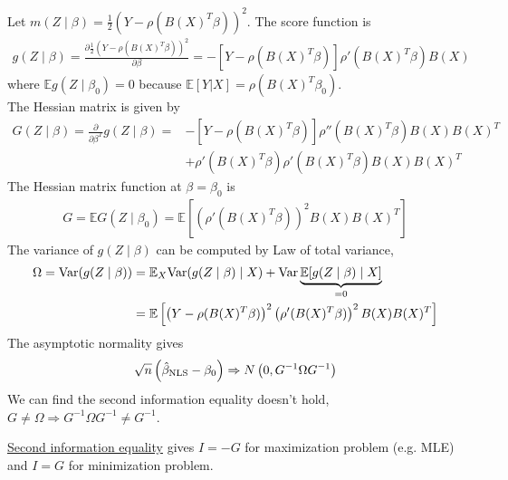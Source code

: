 \documentclass[11pt]{elegantbook}
\begin{document}
Let $m(Z\mid\beta)=\frac{1}{2}(Y-\rho(B(X)^T\beta))^2$. The score function is
\begin{equation}
    \begin{aligned}
        g(Z\mid \beta)=\frac{\partial \frac{1}{2}(Y-\rho(B(X)^T\beta))^2}{\partial \beta}=-\left[Y-\rho(B(X)^T\beta)\right]\rho'(B(X)^T\beta)B(X)
    \end{aligned}
    \nonumber
\end{equation}
where $\mathbb{E}g(Z\mid \beta_0)=0$ because $\mathbb{E}[Y|X]=\rho(B(X)^T\beta_0)$.\\
The Hessian matrix is given by
\begin{equation}
    \begin{aligned}
        G(Z\mid \beta)=\frac{\partial}{\partial \beta^T}g(Z\mid \beta)=&-\left[Y-\rho(B(X)^T\beta)\right]\rho''(B(X)^T\beta)B(X)B(X)^T\\
        &+\rho'(B(X)^T\beta)\rho'(B(X)^T\beta)B(X)B(X)^T
    \end{aligned}
    \nonumber
\end{equation}
The Hessian matrix function at $\beta=\beta_0$ is
\begin{equation}
    \begin{aligned}
        G=\mathbb{E}G(Z\mid\beta_0)=\mathbb{E}\left[(\rho'(B(X)^T\beta))^2B(X)B(X)^T\right]
    \end{aligned}
    \nonumber
\end{equation}
The variance of $g(Z\mid \beta)$ can be computed by Law of total variance,
\begin{equation}
    \begin{aligned}
        \Omega=\textnormal{Var}(g(Z\mid \beta))&=\mathbb{E}_X\textnormal{Var}(g(Z\mid \beta)\mid X)+\textnormal{Var}\underbrace{\mathbb{E}[g(Z\mid \beta)\mid X]}_{=0}\\
        &=\mathbb{E}\left[\left(Y-\rho(B(X)^T\beta)\right)^2\left(\rho'(B(X)^T\beta)\right)^2B(X)B(X)^T\right]
    \end{aligned}
    \nonumber
\end{equation}
The asymptotic normality gives
\begin{equation}
    \begin{aligned}
        \sqrt{n}\left(\hat{\beta}_\textnormal{NLS}-\beta_0\right) \Rightarrow N\left(0,G^{-1}\Omega G^{-1}\right)
    \end{aligned}
    \nonumber
\end{equation}
We can find the second information equality doesn't hold, $G\neq\Omega \Rightarrow G^{-1}\Omega G^{-1}\neq G^{-1}$.
\begin{note}
    \underline{Second information equality} gives $I=-G$ for maximization problem (e.g. MLE) and $I=G$ for minimization problem.
\end{note}
\end{document}
